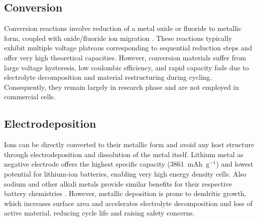 \subsection{Conversion}

Conversion reactions involve reduction of a metal oxide or fluoride to metallic form, coupled with oxide/fluoride ion migration \cite{Gao_2024}. 
These reactions typically exhibit multiple voltage plateaus corresponding to sequential reduction steps and offer very high theoretical capacities. 
However, conversion materials suffer from large voltage hysteresis, low coulombic efficiency, and rapid capacity fade due to electrolyte decomposition and material restructuring during cycling. Consequently, they remain largely in research phase and are not employed in commercial cells.

\subsection{Electrodeposition}

Ions can be directly converted to their metallic form and avoid any host structure through electrodeposition and dissolution of the metal itself. 
Lithium metal as negative electrode offers the highest specific capacity (3861~mAh~g$^{-1}$) and lowest potential for lithium-ion batteries, enabling very high energy density cells. 
Also sodium and other alkali metals provide similar benefits for their respective battery chemistries \cite{brunklausMetalElectrodeNextGen2024}. 
However, metallic deposition is prone to dendritic growth, which increases surface area and accelerates electrolyte decomposition and loss of active material, reducing cycle life and raising safety concerns.





